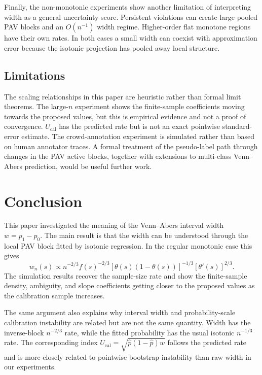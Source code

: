 \documentclass[11pt]{article}
\begin{document}
	Finally, the non-monotonic experiments show another limitation of interpreting width as a general uncertainty score. Persistent violations can create large pooled PAV blocks and an $O(n^{-1})$ width regime. Higher-order flat monotone regions have their own rates. In both cases a small width can coexist with approximation error because the isotonic projection has pooled away local structure.

	\subsection{Limitations}
	The scaling relationships in this paper are heuristic rather than formal limit theorems. The large-$n$ experiment shows the finite-sample coefficients moving towards the proposed values, but this is empirical evidence and not a proof of convergence. $U_{\mathrm{cal}}$ has the predicted rate but is not an exact pointwise standard-error estimate. The crowd-annotation experiment is simulated rather than based on human annotator traces. A formal treatment of the pseudo-label path through changes in the PAV active blocks, together with extensions to multi-class Venn--Abers prediction, would be useful further work.

\section{Conclusion}
	\label{sec:conclusion}

	This paper investigated the meaning of the Venn--Abers interval width $w=p_1-p_0$. The main result is that the width can be understood through the local PAV block fitted by isotonic regression. In the regular monotonic case this gives
	\begin{equation}
		w_n(s)
		\propto
		n^{-2/3}f(s)^{-2/3}
		[\theta(s)(1-\theta(s))]^{-1/3}
		[\theta'(s)]^{2/3}.
	\end{equation}
	The simulation results recover the sample-size rate and show the finite-sample density, ambiguity, and slope coefficients getting closer to the proposed values as the calibration sample increases.

	The same argument also explains why interval width and probability-scale calibration instability are related but are not the same quantity. Width has the inverse-block $n^{-2/3}$ rate, while the fitted probability has the usual isotonic $n^{-1/3}$ rate. The corresponding index $U_{\mathrm{cal}}=\sqrt{\hat p(1-\hat p)w}$ follows the predicted rate and is more closely related to pointwise bootstrap instability than raw width in our experiments.
\end{document}
